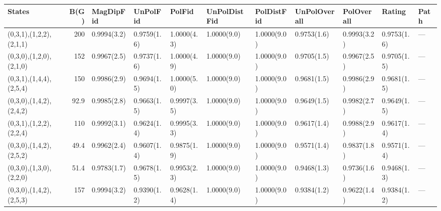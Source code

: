 \begin{tabular}{lrlllllllll}
\hline
 States                  &   B(G) & MagDipFid   & UnPolFid    & PolFid      & UnPolDistFid   & PolDistFid   & UnPolOverall   & PolOverall   & Rating      & Path   \\
\hline
 (0,3,1),(1,2,2),(2,1,1) &  200   & 0.9994(3.2) & 0.9759(1.6) & 1.0000(4.3) & 1.0000(9.0)    & 1.0000(9.0)  & 0.9753(1.6)    & 0.9993(3.2)  & 0.9753(1.6) & ---    \\
 (0,3,0),(1,2,0),(2,1,0) &  152   & 0.9967(2.5) & 0.9737(1.6) & 1.0000(4.9) & 1.0000(9.0)    & 1.0000(9.0)  & 0.9705(1.5)    & 0.9967(2.5)  & 0.9705(1.5) & ---    \\
 (0,3,1),(1,4,4),(2,5,4) &  150   & 0.9986(2.9) & 0.9694(1.5) & 1.0000(5.0) & 1.0000(9.0)    & 1.0000(9.0)  & 0.9681(1.5)    & 0.9986(2.9)  & 0.9681(1.5) & ---    \\
 (0,3,0),(1,4,2),(2,4,2) &   92.9 & 0.9985(2.8) & 0.9663(1.5) & 0.9997(3.5) & 1.0000(9.0)    & 1.0000(9.0)  & 0.9649(1.5)    & 0.9982(2.7)  & 0.9649(1.5) & ---    \\
 (0,3,1),(1,2,2),(2,2,4) &  110   & 0.9992(3.1) & 0.9624(1.4) & 0.9995(3.3) & 1.0000(9.0)    & 1.0000(9.0)  & 0.9617(1.4)    & 0.9988(2.9)  & 0.9617(1.4) & ---    \\
 (0,3,0),(1,4,2),(2,5,2) &   49.4 & 0.9962(2.4) & 0.9607(1.4) & 0.9875(1.9) & 1.0000(9.0)    & 1.0000(9.0)  & 0.9571(1.4)    & 0.9837(1.8)  & 0.9571(1.4) & ---    \\
 (0,3,0),(1,3,0),(2,2,0) &   51.4 & 0.9783(1.7) & 0.9678(1.5) & 0.9953(2.3) & 1.0000(9.0)    & 1.0000(9.0)  & 0.9468(1.3)    & 0.9736(1.6)  & 0.9468(1.3) & ---    \\
 (0,3,0),(1,4,2),(2,5,3) &  157   & 0.9994(3.2) & 0.9390(1.2) & 0.9628(1.4) & 1.0000(9.0)    & 1.0000(9.0)  & 0.9384(1.2)    & 0.9622(1.4)  & 0.9384(1.2) & ---    \\
\hline
\end{tabular}